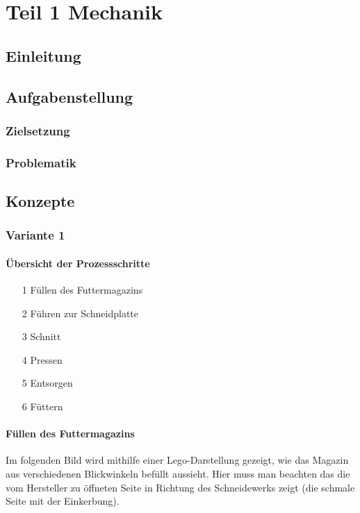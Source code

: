 \chapter{Teil 1 Mechanik}
\section{Einleitung}
\section{Aufgabenstellung}
\subsection{Zielsetzung}
\subsection{Problematik}
\newpage
\section{Konzepte} 



\subsection{Variante 1} 
\subsubsection{Übersicht der Prozessschritte}
\begin{itemize}
\item[1] Füllen des Futtermagazins
\item[2] Führen zur Schneidplatte
\item[3] Schnitt
\item[4] Pressen
\item[5] Entsorgen
\item[6] Füttern
\end{itemize}

\subsubsection{Füllen des Futtermagazins}

Im folgenden Bild wird mithilfe einer Lego-Darstellung gezeigt, wie das Magazin aus verschiedenen Blickwinkeln befüllt aussieht. Hier muss man beachten das die vom Hersteller zu öffneten Seite in Richtung des Schneidewerks zeigt (die schmale Seite mit der Einkerbung).

